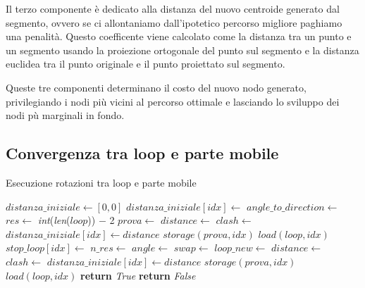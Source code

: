 Il terzo componente è dedicato alla distanza del nuovo centroide generato dal segmento, ovvero se ci allontaniamo dall'ipotetico percorso migliore paghiamo una penalità. Questo coefficente viene calcolato come la distanza tra un punto e un segmento usando la proiezione ortogonale del punto sul segmento e la distanza euclidea tra il punto originale e il punto proiettato sul segmento.

Queste tre componenti determinano il costo del nuovo nodo generato, privilegiando i nodi più vicini al percorso ottimale e lasciando lo sviluppo dei nodi pù marginali in fondo.

\subsection{Convergenza tra loop e parte mobile}\label{subsec:convergenza}
\begin{algorithm}
	\caption{Esecuzione rotazioni tra loop e parte mobile}
	\label{alg:algconvergenza}
	\begin{algorithmic}
		\State $distanza\_iniziale \gets [0,0]$
		\State $distanza\_iniziale[idx] \gets$ 
		\EndFor
		\State $angle\_to\_direction \gets$ 
					\State $res \gets$ \textit{int}(\textit{len}($loop$)) $-$ 2
					\State $prova \gets$ 
					\State $distance \gets$ 
						\State $clash \gets$ 
							\State $distanza\_iniziale[idx] \gets distance$
							\State $storage(prova, idx)$
						\EndIf
					\EndIf
				\EndIf
				\State $load(loop, idx)$
			\EndFor
		\EndFor
		\State $stop\_loop[idx] \gets$ 
		\State $n\_res \gets$ 
		\State $angle \gets$ 
		\State $swap \gets$ 
		\State $loop\_new \gets$ 
		\State $distance \gets$ 
		\State $clash \gets$ 
		\State $distanza\_iniziale[idx] \gets distance$
		\State $storage(prova, idx)$
		\EndIf
		\EndIf
		\State $load(loop, idx)$
		\EndIf
		\EndIf
		\EndFor
		\EndFor
		\State \textbf{return} \textit{True}
		\EndIf
		\State \textbf{return} \textit{False}
		\EndProcedure
	\end{algorithmic}
\end{algorithm}

